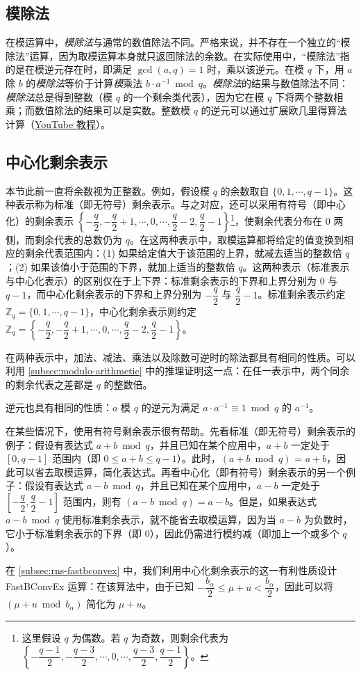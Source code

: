 \subsection{模除法}
\label{subsec:modulo-division}

在模运算中，\textit{模除法}与通常的数值除法不同。严格来说，并不存在一个独立的“模除法”运算，因为取模运算本身就只返回除法的余数。在实际使用中，“模除法”指的是在模逆元存在时，即满足 $\gcd(a,q)=1$ 时，乘以该逆元。在模 $q$ 下，用 $a$ 除 $b$ 的\textit{模除法}等价于计算\textit{模}乘法 $b \cdot a^{-1} \bmod q$。\textit{模除法}的结果与数值除法不同：\textit{模除法}总是得到整数（模 $q$ 的一个剩余类代表），因为它在模 $q$ 下将两个整数相乘；而数值除法的结果可以是实数。整数模 $q$ 的逆元可以通过扩展欧几里得算法计算（\href{https://www.youtube.com/watch?v=fz1vxq5ts5I}{YouTube 教程}）。

\subsection{中心化剩余表示}
\label{subsec:modulo-centered}

本节此前一直将余数视为正整数。例如，假设模 $q$ 的余数取自 $\{0, 1, \cdots, q-1\}$。这种表示称为标准（即无符号）剩余表示。与之对应，还可以采用有符号（即中心化）的剩余表示 $\left\{-\dfrac{q}{2}, -\dfrac{q}{2} + 1, \cdots, 0, \cdots, \dfrac{q}{2} - 2, \dfrac{q}{2} - 1\right\}$\footnote{这里假设 $q$ 为偶数。若 $q$ 为奇数，则剩余代表为 $\left\{ -\dfrac{q-1}{2}, -\dfrac{q-3}{2}, \cdots, 0, \cdots, \dfrac{q-3}{2}, \dfrac{q-1}{2}\right\}$。}，使剩余代表分布在 $0$ 两侧，而剩余代表的总数仍为 $q$。在这两种表示中，取模运算都将给定的值变换到相应的剩余代表范围内：(1) 如果给定值大于该范围的上界，就减去适当的整数倍 $q$；(2) 如果该值小于范围的下界，就加上适当的整数倍 $q$。这两种表示（标准表示与中心化表示）的区别仅在于上下界：标准剩余表示的下界和上界分别为 $0$ 与 $q-1$，而中心化剩余表示的下界和上界分别为 $-\dfrac{q}{2}$ 与 $\dfrac{q}{2} - 1$。标准剩余表示约定 $\mathbb{Z}_q = \{0, 1, \cdots, q-1\}$，中心化剩余表示则约定 $\mathbb{Z}_q = \left\{-\dfrac{q}{2}, -\dfrac{q}{2} + 1, \cdots, 0, \cdots, \dfrac{q}{2} - 2, \dfrac{q}{2} - 1\right\}$。

在两种表示中，加法、减法、乘法以及除数可逆时的除法都具有相同的性质。可以利用 \autoref{subsec:modulo-arithmetic} 中的推理证明这一点：在任一表示中，两个同余的剩余代表之差都是 $q$ 的整数倍。

逆元也具有相同的性质：$a$ 模 $q$ 的逆元为满足 $a \cdot a^{-1} \equiv 1 \bmod q$ 的 $a^{-1}$。

在某些情况下，使用有符号剩余表示很有帮助。先看标准（即无符号）剩余表示的例子：假设有表达式 $a + b \bmod q$，并且已知在某个应用中，$a + b$ 一定处于 $[0, q-1]$ 范围内（即 $0 \leq a + b \leq q-1$）。此时，$(a + b \bmod q)$ = $a + b$，因此可以省去取模运算，简化表达式。再看中心化（即有符号）剩余表示的另一个例子：假设有表达式 $a - b \bmod q$，并且已知在某个应用中，$a - b$ 一定处于 $\left[-\dfrac{q}{2}, \dfrac{q}{2} - 1\right]$ 范围内，则有 $(a - b \bmod q) = a - b$。但是，如果表达式 $a - b \bmod q$ 使用标准剩余表示，就不能省去取模运算，因为当 $a - b$ 为负数时，它小于标准剩余表示的下界（即 $0$），因此仍需进行模约减（即加上一个或多个 $q$）。

在 \autoref{subsec:rns-fastbconvex} 中，我们利用中心化剩余表示的这一有利性质设计 \textsf{FastBConvEx} 运算：在该算法中，由于已知 $-\dfrac{b_\alpha}{2} \leq \mu + u < \dfrac{b_\alpha}{2}$，因此可以将 $(\mu + u \bmod b_\alpha)$ 简化为 $\mu + u$。
